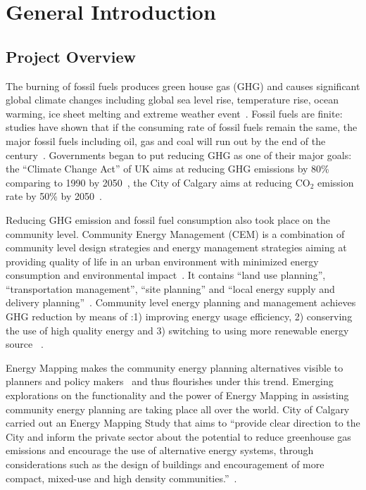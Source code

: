 
\chapter{General Introduction} %

\label{Chapter1} %



\section{Project Overview}
The burning of fossil fuels produces green house gas (GHG) and causes
significant global climate changes including global sea level rise,
temperature rise, ocean warming, ice sheet melting and extreme weather
event~\cite{NASA2015}. Fossil fuels are finite: studies have shown
that if the consuming rate of fossil fuels remain the same, the major
fossil fuels including oil, gas and coal will run out by the end of
the century~\cite{Ecotricity2015, Kathryn2015}. Governments began to
put reducing GHG as one of their major goals: the ``Climate Change
Act'' of UK aims at reducing GHG emissions by 80\% comparing to 1990
by 2050~\cite{carbonBudgetUK}, the City of Calgary aims at reducing
CO$_2$ emission rate by 50\% by 2050~\cite{aacip2009}. 

Reducing GHG emission and fossil fuel consumption also took place on
the community level. Community Energy Management (CEM) is a
combination of community level design strategies and energy management
strategies aiming at providing quality of life in an urban environment
with minimized energy consumption and environmental
impact~\cite{Jaccard19971065}. It contains ``land use planning'',
``transportation management'', ``site planning'' and ``local energy
supply and delivery planning''~\cite{Jaccard19971065}. Community level
energy planning and management achieves GHG reduction by means of :1)
improving energy usage efficiency, 2) conserving the use of high
quality energy and 3) switching to using more renewable energy source
~\cite{StDenis20092088}. 

Energy Mapping makes the community energy planning alternatives
visible to planners and policy makers~\cite{baird2014} and thus
flourishes under this trend. Emerging explorations on the
functionality and the power of Energy Mapping in assisting community
energy planning are taking place all over the world. City of Calgary
carried out an Energy Mapping Study that aims to ``provide clear
direction to the City and inform the private sector about the
potential to reduce greenhouse gas emissions and encourage the use of
alternative energy systems, through considerations such as the design
of buildings and encouragement of more compact, mixed-use and high
density communities.''~\cite{baird2014}.  

